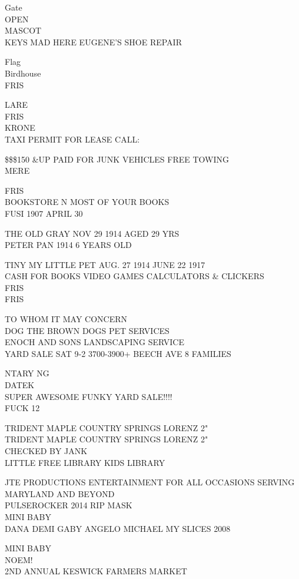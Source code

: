 \documentclass[10pt,letterpaper]{article}
\begin{document}
Gate\\
OPEN\\
MASCOT\\
KEYS MAD HERE EUGENE'S SHOE REPAIR

Flag\\
Birdhouse\\
FRIS

LARE\\
FRIS\\
KRONE\\
TAXI PERMIT FOR LEASE CALL:

\$\$\$150 \&UP PAID FOR JUNK VEHICLES FREE TOWING\\
MERE

FRIS\\
BOOKSTORE N MOST OF YOUR BOOKS\\
FUSI 1907 APRIL 30

THE OLD GRAY NOV 29 1914 AGED 29 YRS\\
PETER PAN 1914 6 YEARS OLD

TINY MY LITTLE PET AUG. 27 1914 JUNE 22 1917\\
CASH FOR BOOKS VIDEO GAMES CALCULATORS \& CLICKERS\\
FRIS\\
FRIS

TO WHOM IT MAY CONCERN\\
DOG THE BROWN DOGS PET SERVICES\\
ENOCH AND SONS LANDSCAPING SERVICE\\
YARD SALE SAT 9{-}2 3700{-}3900+ BEECH AVE 8 FAMILIES

NTARY NG\\
DATEK\\
SUPER AWESOME FUNKY YARD SALE!!!!\\
FUCK 12

TRIDENT MAPLE COUNTRY SPRINGS LORENZ 2"\\
TRIDENT MAPLE COUNTRY SPRINGS LORENZ 2"\\
CHECKED BY JANK\\
LITTLE FREE LIBRARY KIDS LIBRARY

JTE PRODUCTIONS ENTERTAINMENT FOR ALL OCCASIONS SERVING MARYLAND AND BEYOND\\
PULSEROCKER 2014 RIP MASK\\
MINI BABY\\
DANA DEMI GABY ANGELO MICHAEL MY SLICES 2008

MINI BABY\\
NOEM!\\
2ND ANNUAL KESWICK FARMERS MARKET
\end{document}
